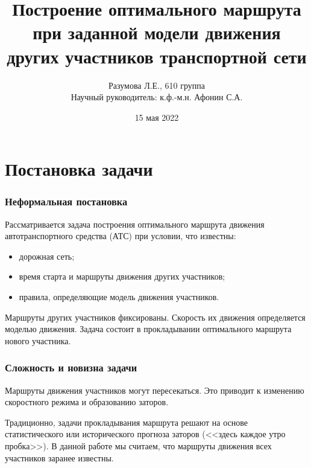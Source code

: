 \documentclass{beamer}
\begin{document}
\title{Построение оптимального маршрута при заданной модели движения других участников транспортной сети}
\author{Разумова Л.Е., 610 группа\\Научный руководитель: к.ф.-м.н. Афонин С.А.}
\date[15.05.2022]{15 мая 2022}

\maketitle



\section{Постановка задачи}

\begin{frame}\frametitle{Неформальная постановка}
  Рассматривается задача построения оптимального маршрута движения автотранспортного средства (АТС) при условии, что известны:
  \begin{itemize}
  \item дорожная сеть;
  \item время старта и маршруты движения других участников;
  \item правила, определяющие модель движения участников.
  \end{itemize}

  Маршруты других участников фиксированы. Скорость их движения определяется моделью движения. Задача состоит в прокладывании оптимального маршрута нового участника.
\end{frame}


\begin{frame}\frametitle{Сложность и новизна задачи}
  Маршруты движения участников могут пересекаться. Это приводит к изменению скоростного режима и образованию заторов.
  
  Традиционно, задачи прокладывания маршрута решают на основе статистического или исторического прогноза заторов (<<здесь каждое утро пробка>>). В данной работе мы считаем, что маршруты движения всех участников заранее известны.
\end{frame}
\end{document}
